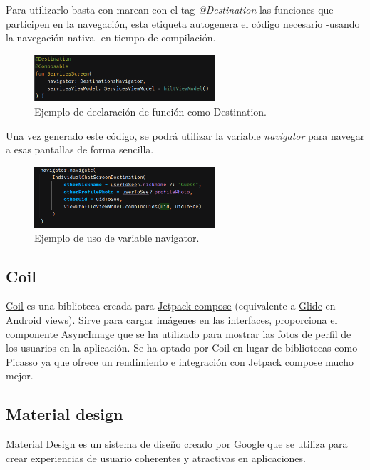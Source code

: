 Para utilizarlo basta con marcan con el tag \textit{@Destination} las funciones que participen en la navegación, esta etiqueta autogenera el código necesario -usando la navegación nativa- en tiempo de compilación. 
\begin{figure}[h]
	\centering
	\includegraphics[width = 0.6\textwidth]{Imagenes/Fuentes/ejemplo_destination.png}
	\caption{Ejemplo de declaración de función como Destination.}
	\label{fig:ejemplo_destination}
\end{figure}

Una vez generado este código, se podrá utilizar la variable \textit{navigator} para navegar a esas pantallas de forma sencilla. 
\begin{figure}[h]
	\centering
	\includegraphics[width = 0.6\textwidth]{Imagenes/Fuentes/ejemplo_navigator.png}
	\caption{Ejemplo de uso de variable navigator.}
	\label{fig:ejemplo_navigator}
\end{figure}

\hypertarget{subsec:coil}{}
\subsection{Coil} 
\href{https://coil-kt.github.io/coil/compose/}{Coil} es una biblioteca creada para \hyperlink{subsec:compose}{Jetpack compose} (equivalente a \href{https://github.com/bumptech/glide}{Glide} en Android views). Sirve para cargar imágenes en las interfaces, proporciona el componente AsyncImage que se ha utilizado para mostrar las fotos de perfil de los usuarios en la aplicación. Se ha optado por Coil en lugar de bibliotecas como \href{https://square.github.io/picasso/}{Picasso} ya que ofrece un rendimiento e integración con \hyperlink{subsec:compose}{Jetpack compose} mucho mejor. 
\subsection{Material design}
\label{subsec:material_design}
\href{https://m3.material.io/}{Material Design} es un sistema de diseño creado por Google que se utiliza para crear experiencias de usuario coherentes y atractivas en aplicaciones. 

